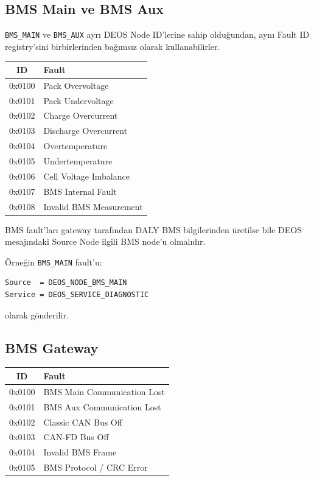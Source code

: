 \documentclass[a4paper,11pt]{article}
\begin{document}
\subsection{BMS Main ve BMS Aux}

\texttt{BMS\_MAIN} ve \texttt{BMS\_AUX} ayrı DEOS Node ID'lerine sahip olduğundan,
aynı Fault ID registry'sini birbirlerinden bağımsız olarak
kullanabilirler.

\begin{center}
\begin{tabular}{c l}
\toprule
\textbf{ID} & \textbf{Fault} \\
\midrule
0x0100 & Pack Overvoltage \\
0x0101 & Pack Undervoltage \\
0x0102 & Charge Overcurrent \\
0x0103 & Discharge Overcurrent \\
0x0104 & Overtemperature \\
0x0105 & Undertemperature \\
0x0106 & Cell Voltage Imbalance \\
0x0107 & BMS Internal Fault \\
0x0108 & Invalid BMS Measurement \\
\bottomrule
\end{tabular}
\end{center}

BMS fault'ları gateway tarafından DALY BMS bilgilerinden üretilse
bile DEOS mesajındaki Source Node ilgili BMS node'u olmalıdır.

Örneğin \texttt{BMS\_MAIN} fault'u:

\begin{lstlisting}
Source  = DEOS_NODE_BMS_MAIN
Service = DEOS_SERVICE_DIAGNOSTIC
\end{lstlisting}

olarak gönderilir.

\subsection{BMS Gateway}

\begin{center}
\begin{tabular}{c l}
\toprule
\textbf{ID} & \textbf{Fault} \\
\midrule
0x0100 & BMS Main Communication Lost \\
0x0101 & BMS Aux Communication Lost \\
0x0102 & Classic CAN Bus Off \\
0x0103 & CAN-FD Bus Off \\
0x0104 & Invalid BMS Frame \\
0x0105 & BMS Protocol / CRC Error \\
\bottomrule
\end{tabular}
\end{center}
\end{document}
